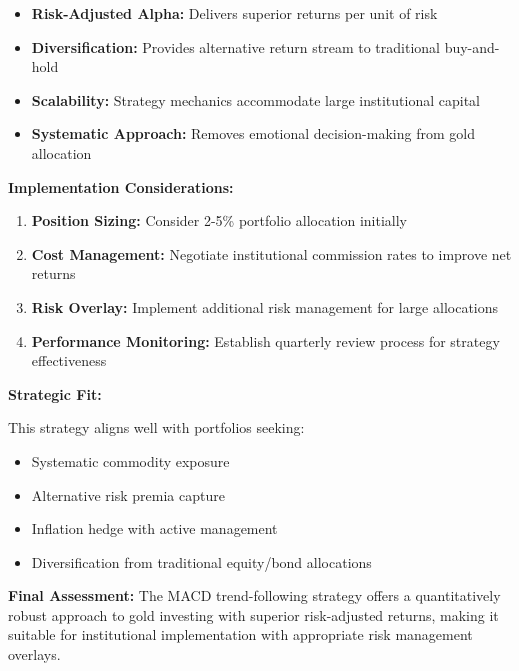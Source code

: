 \documentclass[11pt,a4paper]{article}
\begin{document}
\begin{itemize}
    \item \textbf{Risk-Adjusted Alpha:} Delivers superior returns per unit of risk
    \item \textbf{Diversification:} Provides alternative return stream to traditional buy-and-hold
    \item \textbf{Scalability:} Strategy mechanics accommodate large institutional capital
    \item \textbf{Systematic Approach:} Removes emotional decision-making from gold allocation
\end{itemize}

\textbf{Implementation Considerations:}

\begin{enumerate}
    \item \textbf{Position Sizing:} Consider 2-5\% portfolio allocation initially
    \item \textbf{Cost Management:} Negotiate institutional commission rates to improve net returns
    \item \textbf{Risk Overlay:} Implement additional risk management for large allocations
    \item \textbf{Performance Monitoring:} Establish quarterly review process for strategy effectiveness
\end{enumerate}

\textbf{Strategic Fit:}

This strategy aligns well with portfolios seeking:
\begin{itemize}
    \item Systematic commodity exposure
    \item Alternative risk premia capture
    \item Inflation hedge with active management
    \item Diversification from traditional equity/bond allocations
\end{itemize}

\vspace{1cm}

\textbf{Final Assessment:} The MACD trend-following strategy offers a quantitatively robust approach to gold investing with superior risk-adjusted returns, making it suitable for institutional implementation with appropriate risk management overlays.
\end{document}
